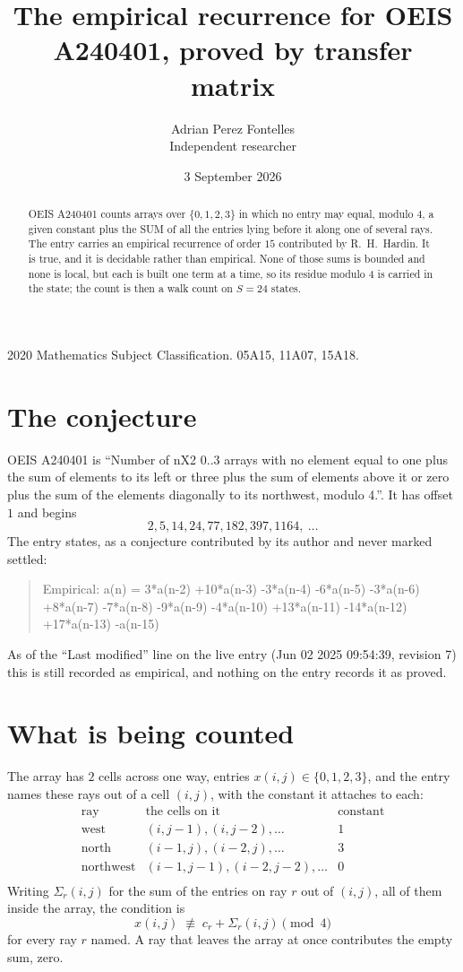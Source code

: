 \documentclass[11pt,a4paper]{article}
\title{The empirical recurrence for OEIS A240401, proved by transfer matrix}
\author{Adrian Perez Fontelles\\ \small Independent researcher}
\date{3 September 2026}
\theoremstyle{plain}
\theoremstyle{definition}
\begin{document}
\maketitle

\begin{abstract}
OEIS A240401 counts arrays over $\{0,1,2,3\}$ in which no entry may equal, modulo $4$, a given
constant plus the SUM of all the entries lying before it along one of several rays. The entry
carries an empirical recurrence of order $15$ contributed by R.~H.~Hardin. It is true, and
it is decidable rather than empirical. None of those sums is bounded and none is local, but
each is built one term at a time, so its residue modulo $4$ is carried in the state; the
count is then a walk count on $S=24$ states.
\end{abstract}

\noindent\small 2020 Mathematics Subject Classification. 05A15, 11A07, 15A18.\normalsize

\section{The conjecture}

OEIS A240401 is ``Number of nX2 0..3 arrays with no element equal to one plus the sum of elements to its left or three plus the sum of elements above it or zero plus the sum of the elements diagonally to its northwest, modulo 4.''. It has offset $1$ and begins
\[
2, 5, 14, 24, 77, 182, 397, 1164,\ \dots
\]
The entry states, as a conjecture contributed by its author and never marked settled:
\begin{quote}
Empirical: a(n) = 3*a(n-2) +10*a(n-3) -3*a(n-4) -6*a(n-5) -3*a(n-6) +8*a(n-7) -7*a(n-8) -9*a(n-9) -4*a(n-10) +13*a(n-11) -14*a(n-12) +17*a(n-13) -a(n-15)
\end{quote}
As of the ``Last modified'' line on the live entry (Jun 02 2025 09:54:39, revision 7) this is still
recorded as empirical, and nothing on the entry records it as proved.

\section{What is being counted}

The array has $2$ cells across one way, entries $x(i,j)\in\{0,1,2,3\}$, and the entry names these
rays out of a cell $(i,j)$, with the constant it attaches to each:
\[
\begin{array}{lll}
\text{ray} & \text{the cells on it} & \text{constant} \\[2pt]
\text{west} & (i,j-1),(i,j-2),\dots & 1 \\
\text{north} & (i-1,j),(i-2,j),\dots & 3 \\
\text{northwest} & (i-1,j-1),(i-2,j-2),\dots & 0 \\
\end{array}
\]
Writing $\Sigma_r(i,j)$ for the sum of the entries on ray $r$ out of $(i,j)$, all of them
inside the array, the condition is
\[
x(i,j)\;\not\equiv\;c_r+\Sigma_r(i,j) \pmod{4}
\]
for every ray $r$ named. A ray that leaves the array at once contributes the empty sum,
zero.
\end{document}
